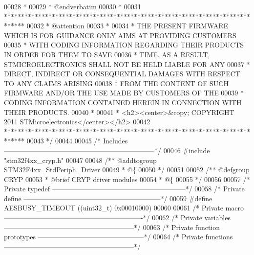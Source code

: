 \begin{DoxyCode}
00028 \textcolor{comment}{  *}
00029 \textcolor{comment}{  *  @endverbatim}
00030 \textcolor{comment}{  *}
00031 \textcolor{comment}{  ******************************************************************************}
00032 \textcolor{comment}{  * @attention}
00033 \textcolor{comment}{  *}
00034 \textcolor{comment}{  * THE PRESENT FIRMWARE WHICH IS FOR GUIDANCE ONLY AIMS AT PROVIDING CUSTOMERS}
00035 \textcolor{comment}{  * WITH CODING INFORMATION REGARDING THEIR PRODUCTS IN ORDER FOR THEM TO SAVE}
00036 \textcolor{comment}{  * TIME. AS A RESULT, STMICROELECTRONICS SHALL NOT BE HELD LIABLE FOR ANY}
00037 \textcolor{comment}{  * DIRECT, INDIRECT OR CONSEQUENTIAL DAMAGES WITH RESPECT TO ANY CLAIMS ARISING}
00038 \textcolor{comment}{  * FROM THE CONTENT OF SUCH FIRMWARE AND/OR THE USE MADE BY CUSTOMERS OF THE}
00039 \textcolor{comment}{  * CODING INFORMATION CONTAINED HEREIN IN CONNECTION WITH THEIR PRODUCTS.}
00040 \textcolor{comment}{  *}
00041 \textcolor{comment}{  * <h2><center>&copy; COPYRIGHT 2011 STMicroelectronics</center></h2>}
00042 \textcolor{comment}{  ******************************************************************************  }
00043 \textcolor{comment}{  */}
00044 
00045 \textcolor{comment}{/* Includes ------------------------------------------------------------------*/}
00046 \textcolor{preprocessor}{#}\textcolor{preprocessor}{include} "stm32f4xx_cryp.h"
00047 
00048 \textcolor{comment}{/** @addtogroup STM32F4xx\_StdPeriph\_Driver}
00049 \textcolor{comment}{  * @\{}
00050 \textcolor{comment}{  */}
00051 
00052 \textcolor{comment}{/** @defgroup CRYP }
00053 \textcolor{comment}{  * @brief CRYP driver modules}
00054 \textcolor{comment}{  * @\{}
00055 \textcolor{comment}{  */}
00056 
00057 \textcolor{comment}{/* Private typedef -----------------------------------------------------------*/}
00058 \textcolor{comment}{/* Private define ------------------------------------------------------------*/}
00059 \textcolor{preprocessor}{#}\textcolor{preprocessor}{define} \textcolor{preprocessor}{AESBUSY\_TIMEOUT}    \textcolor{preprocessor}{(}\textcolor{preprocessor}{(}\textcolor{preprocessor}{uint32\_t}\textcolor{preprocessor}{)} 0x00010000\textcolor{preprocessor}{)}
00060 
00061 \textcolor{comment}{/* Private macro -------------------------------------------------------------*/}
00062 \textcolor{comment}{/* Private variables ---------------------------------------------------------*/}
00063 \textcolor{comment}{/* Private function prototypes -----------------------------------------------*/}
00064 \textcolor{comment}{/* Private functions ---------------------------------------------------------*/}

\end{DoxyCode}
